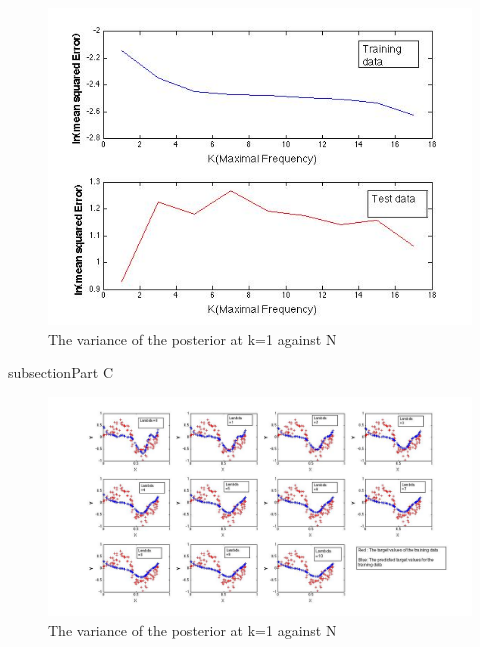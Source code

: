 \documentclass[14pt]{report}
\begin{document}
\begin{figure}[h!]
  \caption{The variance of the posterior at k=1 against N }
  \centering
    \includegraphics[width=1\textwidth]{4b.jpg}
\end{figure}
subsection{Part C}
\begin{figure}[h!]
  \caption{The variance of the posterior at k=1 against N }
  \centering
    \includegraphics[width=1\textwidth]{4C.jpg}
\end{figure}
\end{document}
